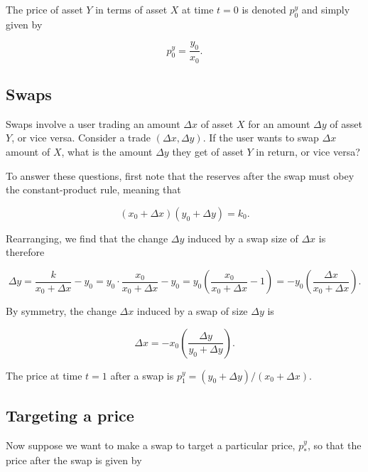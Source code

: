 \documentclass[a4paper, 11pt]{article}
\begin{document}
The price of asset $Y$ in terms of asset $X$ at time $t = 0$ is denoted $p^y_0$ and simply given by

\begin{equation}
\label{eq:p^y_0}
p^y_0 = \frac{y_0}{x_0}.
\end{equation}

\subsection{Swaps}

Swaps involve a user trading an amount $\Delta x$ of asset $X$ for an amount $\Delta y$ of asset $Y$, or vice versa. Consider a trade $(\Delta x, \Delta y)$. If the user wants to swap $\Delta x$ amount of $X$, what is the amount $\Delta y$ they get of asset $Y$ in return, or vice versa? 

To answer these questions, first note that the reserves after the swap must obey the constant-product rule, meaning that

\begin{equation}
(x_0 + \Delta x) (y_0 + \Delta y) = k_0.
\end{equation}

Rearranging, we find that the change $\Delta y$ induced by a swap size of $\Delta x$ is therefore

\begin{equation}
\label{eq:delta-y}
\Delta y = \frac{k}{x_0 + \Delta x} - y_0 =  y_0 \cdot \frac{x_0}{x_0 + \Delta x} - y_0 = y_0 \left(  \frac{x_0}{x_0 + \Delta x} - 1 \right) = - y_0 \left(  \frac{\Delta x}{x_0 + \Delta x} \right).
\end{equation}

By symmetry, the change $\Delta x$ induced by a swap of size $\Delta y$ is 

\begin{equation}
\label{eq:delta-x}
\Delta x = - x_0 \left(  \frac{\Delta y}{y_0 + \Delta y} \right).
\end{equation}

The price at time $t = 1$ after a swap is $p^y_1 = (y_0 + \Delta y) / (x_0 + \Delta x) $.

\subsection{Targeting a price}

Now suppose we want to make a swap to target a particular price, $p_*^y$, so that the price after the swap is given by
\end{document}
